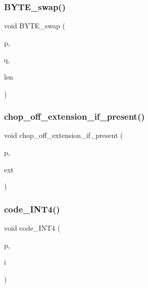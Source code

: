 \mbox{\label{util_8_c_ae6c831db6b5b53ea597dc3725f4f5d83}} 
\subsubsection{\texorpdfstring{B\+Y\+T\+E\+\_\+swap()}{BYTE\_swap()}}
{\footnotesize\ttfamily void B\+Y\+T\+E\+\_\+swap (\begin{DoxyParamCaption}\item[{\mbox{\hyperlink{galois_8h_ab6cc7b4aeb6ea31aba2b3fbfc83ff5e6}{B\+Y\+TE}} $\ast$}]{p,  }\item[{\mbox{\hyperlink{galois_8h_ab6cc7b4aeb6ea31aba2b3fbfc83ff5e6}{B\+Y\+TE}} $\ast$}]{q,  }\item[{\mbox{\hyperlink{galois_8h_a09fddde158a3a20bd2dcadb609de11dc}{I\+NT}}}]{len }\end{DoxyParamCaption})}

\mbox{\label{util_8_c_a9ca43842b56cb96c492a4b2d285a6864}} 
\subsubsection{\texorpdfstring{chop\+\_\+off\+\_\+extension\+\_\+if\+\_\+present()}{chop\_off\_extension\_if\_present()}}
{\footnotesize\ttfamily void chop\+\_\+off\+\_\+extension\+\_\+if\+\_\+present (\begin{DoxyParamCaption}\item[{char $\ast$}]{p,  }\item[{const char $\ast$}]{ext }\end{DoxyParamCaption})}

\mbox{\label{util_8_c_a77bf7a59ce7634a3328237f863fd1251}} 
\subsubsection{\texorpdfstring{code\+\_\+\+I\+N\+T4()}{code\_INT4()}}
{\footnotesize\ttfamily void code\+\_\+\+I\+N\+T4 (\begin{DoxyParamCaption}\item[{char $\ast$\&}]{p,  }\item[{\mbox{\hyperlink{galois_8h_a6675ac57b948be915e03c09228b57b05}{I\+N\+T4}}}]{i }\end{DoxyParamCaption})}

